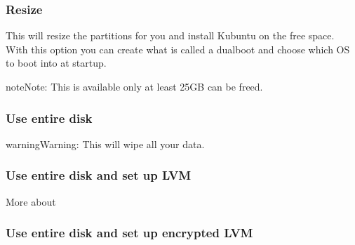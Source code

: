 \documentclass[letterpaper,10pt,english]{sphinxmanual}
\begin{document}
\subsubsection{Resize}
\label{\detokenize{docs/installation:resize}}
\sphinxAtStartPar
This will resize the partitions for you and install Kubuntu on the free space. With this option you can create what is called a dual\sphinxhyphen{}boot and choose which OS to boot into at startup.

\begin{sphinxadmonition}{note}{Note:}
\sphinxAtStartPar
This is available only at least 25GB can be freed.
\end{sphinxadmonition}


\subsubsection{Use entire disk}
\label{\detokenize{docs/installation:use-entire-disk}}


\begin{sphinxadmonition}{warning}{Warning:}
\sphinxAtStartPar
This will wipe all your data.
\end{sphinxadmonition}


\subsubsection{Use entire disk and set up LVM}
\label{\detokenize{docs/installation:use-entire-disk-and-set-up-lvm}}
\sphinxAtStartPar
More about 


\subsubsection{Use entire disk and set up encrypted LVM}
\label{\detokenize{docs/installation:use-entire-disk-and-set-up-encrypted-lvm}}

\end{document}
